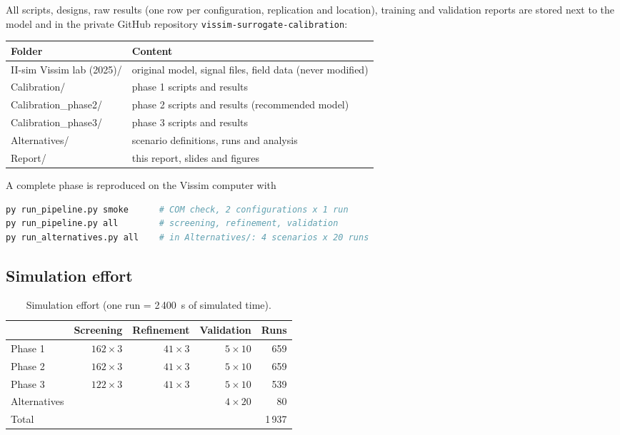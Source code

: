 \documentclass[11pt,a4paper]{article}
\newcommand{\code}[1]{\texttt{#1}}
\begin{document}
All scripts, designs, raw results (one row per configuration, replication and location), training
and validation reports are stored next to the model and in the private GitHub repository
\code{vissim-surrogate-calibration}:
\begin{center}
\small
\begin{tabular}{>{\ttfamily}ll}
\toprule
\textrm{\textbf{Folder}} & \textbf{Content}\\
\midrule
II-sim Vissim lab (2025)/ & original model, signal files, field data (never modified)\\
Calibration/              & phase 1 scripts and results\\
Calibration\_phase2/      & phase 2 scripts and results (recommended model)\\
Calibration\_phase3/      & phase 3 scripts and results\\
Alternatives/             & scenario definitions, runs and analysis\\
Report/                   & this report, slides and figures\\
\bottomrule
\end{tabular}
\end{center}
A complete phase is reproduced on the Vissim computer with
\begin{lstlisting}[language=bash,numbers=none]
py run_pipeline.py smoke      # COM check, 2 configurations x 1 run
py run_pipeline.py all        # screening, refinement, validation
py run_alternatives.py all    # in Alternatives/: 4 scenarios x 20 runs
\end{lstlisting}

\subsection{Simulation effort}

\begin{table}[!htb]
\centering
\caption[Simulation effort]{Simulation effort (one run = 2\,400~s of simulated time).}
\label{tab:effort}
\small
\begin{tabular}{lrrrr}
\toprule
& \textbf{Screening} & \textbf{Refinement} & \textbf{Validation} & \textbf{Runs}\\
\midrule
Phase 1      & $162 \times 3$ & $41 \times 3$ & $5 \times 10$ & 659\\
Phase 2      & $162 \times 3$ & $41 \times 3$ & $5 \times 10$ & 659\\
Phase 3      & $122 \times 3$ & $41 \times 3$ & $5 \times 10$ & 539\\
Alternatives &                &               & $4 \times 20$ & 80\\
\midrule
Total        &                &               &               & 1\,937\\
\bottomrule
\end{tabular}
\end{table}
\end{document}
